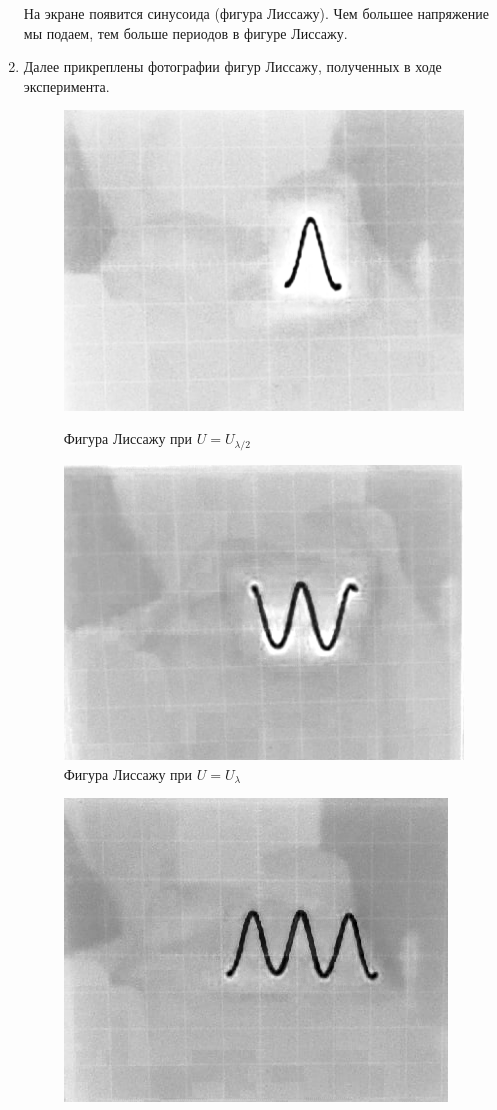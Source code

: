 \documentclass[a4paper,12pt]{article}
\begin{document}
\begin{enumerate}
На экране появится синусоида (фигура Лиссажу). Чем большее напряжение мы подаем, тем больше периодов в фигуре Лиссажу.
\item Далее прикреплены фотографии фигур Лиссажу, полученных в ходе эксперимента. 
\begin{figure}[h!]
\begin{minipage}[h!]{0.4\linewidth}
\centering
\includegraphics[scale=0.5]{lis_1.png} 
\caption{Фигура Лиссажу при  $U = U_{\lambda/2}$}
\end{minipage}
\hfill
\begin{minipage}[h]{0.4\linewidth}
\includegraphics[scale=0.5]{lis_2.png} 
\caption{Фигура Лиссажу при  $U = U_{\lambda}$}
\end{minipage}
\end{figure}
\begin{figure}[h!]
\centering
\includegraphics[scale=0.5]{lis_3.png} 

\end{figure}
\end{enumerate}
\end{document}
